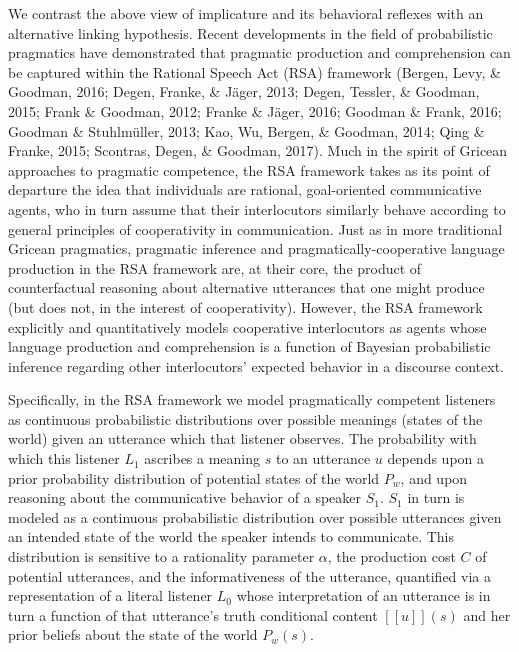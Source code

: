 \documentclass[man]{apa6}
\theoremstyle{definition}
\theoremstyle{definition}
\theoremstyle{definition}
\theoremstyle{remark}
\begin{document}
We contrast the above view of implicature and its behavioral reflexes
with an alternative linking hypothesis. Recent developments in the field
of probabilistic pragmatics have demonstrated that pragmatic production
and comprehension can be captured within the Rational Speech Act (RSA)
framework (Bergen, Levy, \& Goodman, 2016; Degen, Franke, \& Jäger,
2013; Degen, Tessler, \& Goodman, 2015; Frank \& Goodman, 2012; Franke
\& Jäger, 2016; Goodman \& Frank, 2016; Goodman \& Stuhlmüller, 2013;
Kao, Wu, Bergen, \& Goodman, 2014; Qing \& Franke, 2015; Scontras,
Degen, \& Goodman, 2017). Much in the spirit of Gricean approaches to
pragmatic competence, the RSA framework takes as its point of departure
the idea that individuals are rational, goal-oriented communicative
agents, who in turn assume that their interlocutors similarly behave
according to general principles of cooperativity in communication. Just
as in more traditional Gricean pragmatics, pragmatic inference and
pragmatically-cooperative language production in the RSA framework are,
at their core, the product of counterfactual reasoning about alternative
utterances that one might produce (but does not, in the interest of
cooperativity). However, the RSA framework explicitly and quantitatively
models cooperative interlocutors as agents whose language production and
comprehension is a function of Bayesian probabilistic inference
regarding other interlocutors' expected behavior in a discourse context.

Specifically, in the RSA framework we model pragmatically competent
listeners as continuous probabilistic distributions over possible
meanings (states of the world) given an utterance which that listener
observes. The probability with which this listener \(L_1\) ascribes a
meaning \(s\) to an utterance \(u\) depends upon a prior probability
distribution of potential states of the world \(P_w\), and upon
reasoning about the communicative behavior of a speaker \(S_1\). \(S_1\)
in turn is modeled as a continuous probabilistic distribution over
possible utterances given an intended state of the world the speaker
intends to communicate. This distribution is sensitive to a rationality
parameter \(\alpha\), the production cost \(C\) of potential utterances,
and the informativeness of the utterance, quantified via a
representation of a literal listener \(L_0\) whose interpretation of an
utterance is in turn a function of that utterance's truth conditional
content \([[u]](s)\) and her prior beliefs about the state of the world
\(P_w(s)\).
\end{document}
